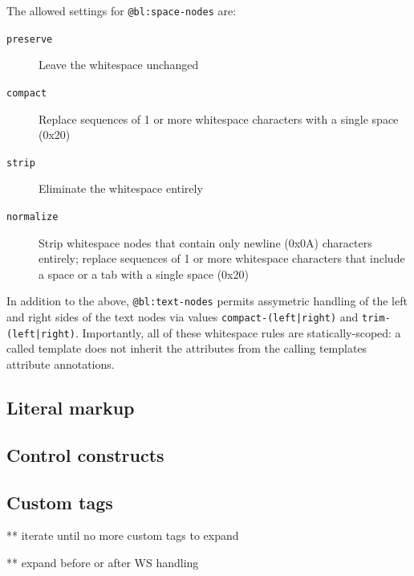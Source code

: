 \documentclass{www2003-submission}
\newcommand{\smtexttt}[1]{{\small\texttt{#1}}}
\begin{document}
The allowed settings for \smtexttt{@bl:space-nodes} are:

\begin{description}
  
\item[\smtexttt{preserve}] Leave the whitespace unchanged
      
\item[\smtexttt{compact}] Replace sequences of 1 or more
      whitespace characters with a single space (0x20)
      
\item[\smtexttt{strip}] Eliminate the whitespace entirely

\item[\smtexttt{normalize}] Strip whitespace nodes that contain only
newline (0x0A) characters entirely; replace sequences of 1 or more
whitespace characters that include a space or a tab with a single
space (0x20)

\end{description}

In addition to the above, \smtexttt{@bl:text-nodes} permits assymetric
handling of the left and right sides of the text nodes via values
\smtexttt{compact-(left|right)} and \smtexttt{trim-(left|right)}. 
Importantly, all of these whitespace rules are statically-scoped:
a called template does not inherit the attributes from the calling
templates attribute annotations.

\subsection{Literal markup}
\label{ssec-literal-markup}


\subsection{Control constructs}
\label{ssec-control}

\subsection{Custom tags}

** iterate until no more custom tags to expand

** expand before or after WS handling
\end{document}
